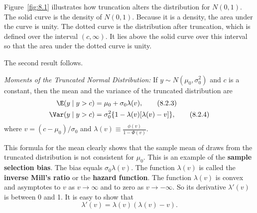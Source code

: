 Figure~\ref{fig:8.1} illustrates how truncation alters the distribution for $N(0,1)$. The solid
curve is the density of $N(0,1)$. Because it is a density, the area under the curve is
unity. The dotted curve is the distribution after truncation, which is defined over
the interval $(c, \infty)$. It lies above the solid curve over this interval so that the area
under the dotted curve is unity.

The second result follows.

\medskip
\noindent\textit{Moments of the Truncated Normal Distribution:}\quad
If $y \sim N(\mu_0, \sigma_0^2)$ and $c$ is a constant, then the mean and the variance of the truncated distribution are
\begin{align}
  \E(y \mid y > c) &= \mu_0 + \sigma_0 \lambda(v),
  \label{eq:8.2.3} \tag{8.2.3} \\
  \Var(y \mid y > c) &= \sigma_0^2 \{1 - \lambda(v)[\lambda(v) - v]\},
  \label{eq:8.2.4} \tag{8.2.4}
\end{align}
where $v = (c - \mu_0)/\sigma_0$ and
$\lambda(v) \equiv \frac{\phi(v)}{1 - \Phi(v)}$.

This formula for the mean clearly shows that the sample mean of draws from the
truncated distribution is not consistent for $\mu_0$. This is an example of the \textbf{sample
selection bias}. The bias equals $\sigma_0 \lambda(v)$. The function $\lambda(v)$ is called the
\textbf{inverse Mill's ratio} or the \textbf{hazard function}. The function $\lambda(v)$ is convex and asymptotes
to $v$ as $v \to \infty$ and to zero as $v \to -\infty$. So its derivative $\lambda'(v)$ is between 0 and
1. It is easy to show that
\begin{equation}
  \lambda'(v) = \lambda(v)(\lambda(v) - v).
  \label{eq:8.2.5} \tag{8.2.5}
\end{equation}

